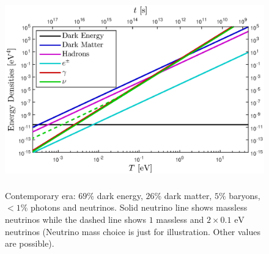 \documentclass[universe,article,submit,moreauthors,pdftex,a4paper]{Definitions/mdpi}
\newcommand{\eV}{\text{ eV}}
\begin{document}
\begin{figure}
  \centerline{\hspace*{0.4cm}\includegraphics[height=8.5cm]{./plots/energy_densities.eps}}
  \caption{Contemporary era: $69\%$ dark energy, $26\%$ dark matter, $5\%$ baryons, $<1\%$ photons and neutrinos.  Solid neutrino line shows massless neutrinos while the dashed line shows $1$ massless and $2\times 0.1\eV$ neutrinos (Neutrino mass choice is just for illustration.  Other values are possible). \label{CosmicDensity}}
\end{figure}

\end{document}
